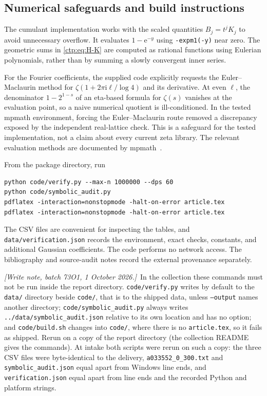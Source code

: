 \documentclass[11pt,a4paper]{article}
\numberwithin{equation}{section}
\theoremstyle{definition}
\theoremstyle{remark}
\newcommand{\ii}{\mathrm i}
\newcommand{\e}{\mathrm e}
\newcommand{\writenote}[1]{\par\smallskip\noindent
 \textit{[Write note, batch 73O1, 1 October 2026.]}\ #1\par\smallskip}
\begin{document}
\subsection{Numerical safeguards and build instructions}
The cumulant implementation works with the scaled quantities $B_j=t^jK_j$
to avoid unnecessary overflow. It evaluates $1-\e^{-y}$ using
\texttt{-expm1(-y)} near zero. The geometric sums in \eqref{ctp:eq:H-K} are
computed as rational functions using Eulerian polynomials, rather than
by summing a slowly convergent inner series.

For the Fourier coefficients, the supplied code explicitly requests the
Euler--Maclaurin method for $\zeta(1+2\pi\ii\ell/\log4)$ and its derivative.
At even $\ell$, the denominator $1-2^{1-s}$ of an eta-based formula for
$\zeta(s)$ vanishes at the evaluation point, so a naive numerical quotient
is ill-conditioned. In the tested mpmath environment, forcing the
Euler--Maclaurin route removed a discrepancy exposed by the independent
real-lattice check. This is a safeguard for the tested implementation,
not a claim about every current zeta library. The relevant evaluation
methods are documented by mpmath~\cite{mpmath}.

From the package directory, run
\begin{verbatim}
python code/verify.py --max-n 1000000 --dps 60
python code/symbolic_audit.py
pdflatex -interaction=nonstopmode -halt-on-error article.tex
pdflatex -interaction=nonstopmode -halt-on-error article.tex
\end{verbatim}
The CSV files are convenient for inspecting the tables, and
\texttt{data/verification.json} records the environment, exact checks,
constants, and additional Gaussian coefficients. The code performs no
network access. The bibliography and source-audit notes record the external
provenance separately.

\writenote{In the collection these commands must not be run inside the
report directory. \texttt{code/verify.py} writes by default to the
\texttt{data/} directory beside \texttt{code/}, that is to the shipped
data, unless \texttt{--output} names another directory;
\texttt{code/symbolic\_audit.py} always writes
\texttt{../data/symbolic\_audit.json} relative to its own location and
has no option; and \texttt{code/build.sh} changes into \texttt{code/},
where there is no \texttt{article.tex}, so it fails as shipped. Rerun
on a copy of the report directory (the collection README gives the
commands). At intake both scripts were rerun on such a copy: the three
CSV files were byte-identical to the delivery,
\texttt{a033552\_0\_300.txt} and \texttt{symbolic\_audit.json} equal
apart from Windows line ends, and \texttt{verification.json} equal
apart from line ends and the recorded Python and platform strings.}
\end{document}
